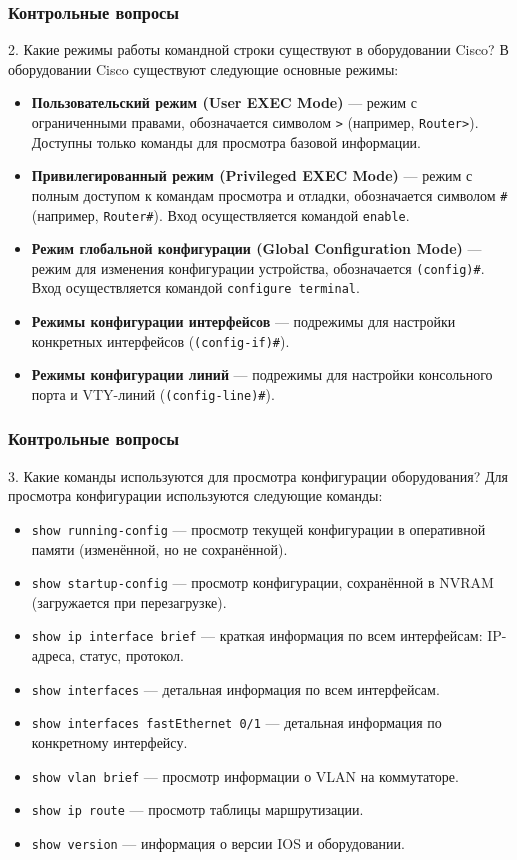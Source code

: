 \begin{frame}
\frametitle{Контрольные вопросы}
\begin{block}{2. Какие режимы работы командной строки существуют в оборудовании Cisco?}
В оборудовании Cisco существуют следующие основные режимы:
\begin{itemize}
    \item \textbf{Пользовательский режим (User EXEC Mode)} — режим с ограниченными правами, обозначается символом \texttt{>} (например, \texttt{Router>}). Доступны только команды для просмотра базовой информации.
    \item \textbf{Привилегированный режим (Privileged EXEC Mode)} — режим с полным доступом к командам просмотра и отладки, обозначается символом \texttt{#} (например, \texttt{Router#}). Вход осуществляется командой \texttt{enable}.
    \item \textbf{Режим глобальной конфигурации (Global Configuration Mode)} — режим для изменения конфигурации устройства, обозначается \texttt{(config)\#}. Вход осуществляется командой \texttt{configure terminal}.
    \item \textbf{Режимы конфигурации интерфейсов} — подрежимы для настройки конкретных интерфейсов (\texttt{(config-if)\#}).
    \item \textbf{Режимы конфигурации линий} — подрежимы для настройки консольного порта и VTY-линий (\texttt{(config-line)\#}).
\end{itemize}
\end{block}
\end{frame}

\begin{frame}
\frametitle{Контрольные вопросы}
\begin{block}{3. Какие команды используются для просмотра конфигурации оборудования?}
Для просмотра конфигурации используются следующие команды:
\begin{itemize}
    \item \texttt{show running-config} — просмотр текущей конфигурации в оперативной памяти (изменённой, но не сохранённой).
    \item \texttt{show startup-config} — просмотр конфигурации, сохранённой в NVRAM (загружается при перезагрузке).
    \item \texttt{show ip interface brief} — краткая информация по всем интерфейсам: IP-адреса, статус, протокол.
    \item \texttt{show interfaces} — детальная информация по всем интерфейсам.
    \item \texttt{show interfaces fastEthernet 0/1} — детальная информация по конкретному интерфейсу.
    \item \texttt{show vlan brief} — просмотр информации о VLAN на коммутаторе.
    \item \texttt{show ip route} — просмотр таблицы маршрутизации.
    \item \texttt{show version} — информация о версии IOS и оборудовании.
\end{itemize}
\end{block}
\end{frame}

